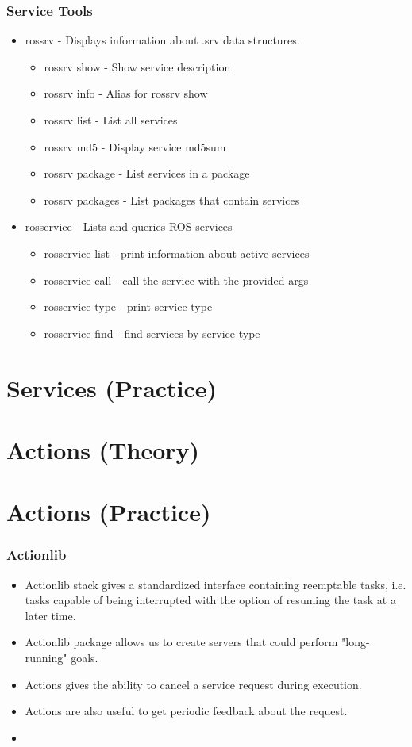 \documentclass{beamer}
\begin{document}
	\begin{frame}
		\frametitle{Service Tools}
		\begin{itemize}
			\item{rossrv - Displays information about .srv data structures.}
			\begin{itemize}
				\item{rossrv show - Show service description}
				\item{rossrv info - Alias for rossrv show}
				\item{rossrv list - List all services}
				\item{rossrv md5 - Display service md5sum}
				\item{rossrv package - List services in a package}
				\item{rossrv packages - List packages that contain services}
				
			\end{itemize}
			\item{rosservice - Lists and queries ROS services}
			\begin{itemize}
				\item{rosservice list - print information about active services}
				\item{rosservice call - call the service with the provided args}
				\item{rosservice type - print service type}
				\item{rosservice find - find services by service type}
			\end{itemize}
		\end{itemize}
	\end{frame}
\section{Services (Practice)}
\section{Actions (Theory)}
\section{Actions (Practice)}
	\begin{frame}
		\frametitle{Actionlib}
		\begin{itemize}
			\item{Actionlib stack gives a standardized interface containing reemptable tasks, i.e. tasks capable of being interrupted with the option of resuming the task at a later time.}
			\item{Actionlib package allows us to create servers that could perform "long-running" goals.}
			\item{Actions gives the ability to cancel a service request during execution.}
			\item{Actions are also useful to get periodic feedback about the request.}
			\item{}
		\end{itemize}
	\end{frame}
	
\end{document}
